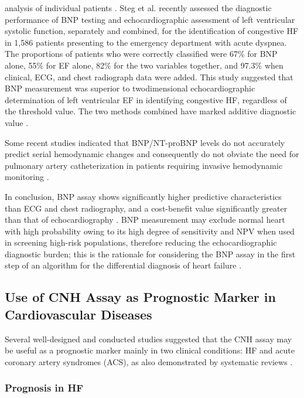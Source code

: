 \documentclass[14pt,a4paper,onecolumn]{extarticle}
\begin{document}
analysis of individual patients \citep{bib3180}. Steg et al. \citep{bib3181} recently assessed the diagnostic performance of BNP testing and echocardiographic assessment of left ventricular systolic
function, separately and combined, for the identification of congestive HF in 1,586
patients presenting to the emergency department with acute dyspnea. The proportions
of patients who were correctly classified were 67\% for BNP alone, 55\% for EF alone,
82\% for the two variables together, and 97.3\% when clinical, ECG, and chest radiograph
data were added. This study suggested that BNP measurement was superior to twodimensional echocardiographic determination of left ventricular EF in identifying congestive HF, regardless of the threshold value. The two methods combined have marked
additive diagnostic value \citep{bib3181}.

Some recent studies indicated that BNP/NT-proBNP levels do not accurately predict serial hemodynamic changes and consequently do not obviate the need for pulmonary artery catheterization in patients requiring invasive hemodynamic monitoring
\citep{bib3182} \citep{bib3183} \citep{bib3184}.

In conclusion, BNP assay shows significantly higher predictive characteristics than
ECG and chest radiography, and a cost-benefit value significantly greater than that of
echocardiography \citep{bib392} \citep{bib3170}. BNP measurement may exclude normal heart with high
probability owing to its high degree of sensitivity and NPV when used in screening
high-risk populations, therefore reducing the echocardiographic diagnostic burden;
this is the rationale for considering the BNP assay in the first step of an algorithm for
the differential diagnosis of heart failure \citep{bib337} \citep{bib365} \citep{bib369} \citep{bib370} \citep{bib3168} \citep{bib3175}.


\subsection{ Use of CNH Assay as Prognostic Marker in Cardiovascular Diseases}

Several well-designed and conducted studies suggested that the CNH assay may be useful as a prognostic marker mainly in two clinical conditions: HF and acute coronary
artery syndromes (ACS), as also demonstrated by systematic reviews \citep{bib35} \citep{bib376} \citep{bib3184} \citep{bib3185}.


\subsubsection{ Prognosis in HF}
\end{document}
